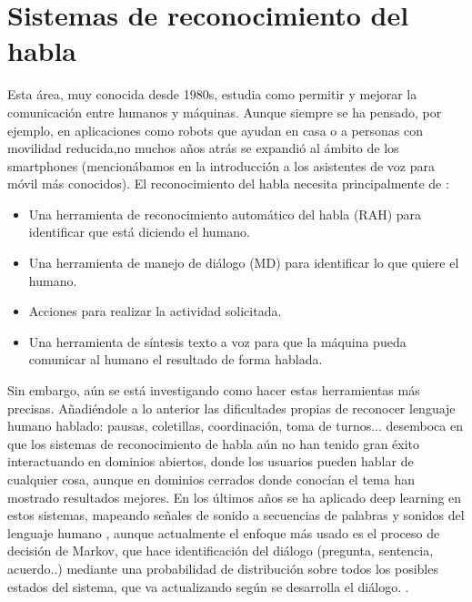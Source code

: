 \section*{Sistemas de reconocimiento del habla}

Esta área, muy conocida desde 1980s, estudia como permitir y mejorar la comunicación entre humanos y máquinas. Aunque siempre se ha pensado, por ejemplo, en aplicaciones como robots que ayudan en casa o a personas con movilidad reducida,no muchos años atrás se expandió al ámbito de los smartphones (mencionábamos en la introducción a los asistentes de voz para móvil más conocidos). \newline
El reconocimiento del habla necesita principalmente de :
\begin{itemize}
\item Una herramienta de reconocimiento automático del habla (RAH) para identificar que está diciendo el humano.
\item Una herramienta de manejo de diálogo (MD) para identificar lo que quiere el humano.
\item Acciones para realizar la actividad solicitada.
\item Una herramienta de síntesis texto a voz para que la máquina pueda comunicar al humano el resultado de forma hablada.
\end{itemize}
Sin embargo, aún se está investigando como hacer estas herramientas más precisas. Añadiéndole a lo anterior las dificultades propias de reconocer lenguaje humano hablado: pausas, coletillas, coordinación, toma de turnos... desemboca en que los sistemas de reconocimiento de habla aún no han tenido gran éxito interactuando en dominios abiertos, donde los usuarios pueden hablar de cualquier cosa, aunque en dominios cerrados donde conocían el tema han mostrado resultados mejores. \newline
En los últimos años se ha aplicado deep learning en estos sistemas, mapeando señales de sonido a secuencias de palabras y sonidos del lenguaje humano \citet{hinton2012deep}, aunque actualmente el
enfoque más usado es el proceso de decisión de Markov, que hace identificación del diálogo (pregunta, sentencia, acuerdo..) mediante una probabilidad de distribución sobre todos los posibles estados del sistema, que va actualizando según se desarrolla el diálogo. \citet{young2013pomdp}.

